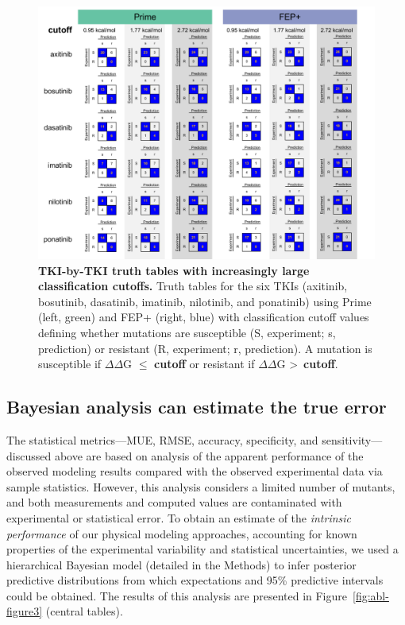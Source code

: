 \documentclass[phd,tocprelim]{cornell}
\begin{document}
\begin{landscape}
	\begin{figure}[p]
		\centering
		\includegraphics[width=0.8\linewidth]{figures/abl-supplementary-figure-2.pdf}
		\caption[TKI-by-TKI truth tables with increasingly large classification cutoffs.]{
			{\bf TKI-by-TKI truth tables with increasingly large classification cutoffs.}
			Truth tables for the six TKIs (axitinib, bosutinib, dasatinib, imatinib, nilotinib, and ponatinib) using Prime (left, green) and FEP+ (right, blue) with classification cutoff values defining whether mutations are susceptible (S, experiment; s, prediction) or resistant (R, experiment; r, prediction). 
			A mutation is susceptible if $\Delta\Delta$G $\le$ \textbf{cutoff} or resistant if $\Delta\Delta$G \textgreater~\textbf{cutoff}.
		}
		\label{fig:abl-figure-si-2}
	\end{figure}
\end{landscape}

\subsection{Bayesian analysis can estimate the true error}
The statistical metrics---MUE, RMSE, accuracy, specificity, and sensitivity---discussed above are based on analysis of the apparent performance of the observed modeling results compared with the observed experimental data via sample statistics.
However, this analysis considers a limited number of mutants, and both measurements and computed values are contaminated with experimental or statistical error. 
To obtain an estimate of the \emph{intrinsic performance} of our physical modeling approaches, accounting for known properties of the experimental variability and statistical uncertainties, we used a hierarchical Bayesian model (detailed in the Methods) to infer posterior predictive distributions from which expectations and 95\% predictive intervals could be obtained.
The results of this analysis are presented in Figure~\ref{fig:abl-figure3} (central tables). 
\end{document}
